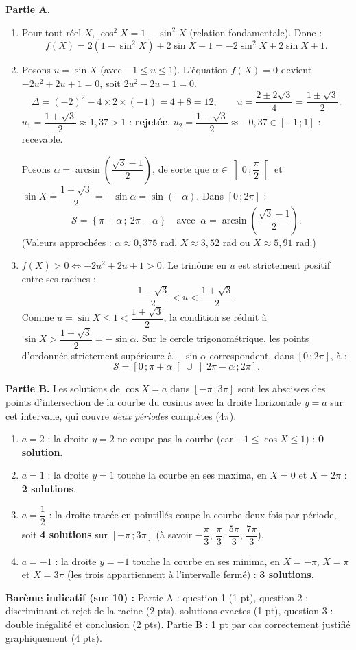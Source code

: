 \documentclass[11pt]{article}
\begin{document}
\begin{corrige}
\textbf{Partie A.}
\begin{enumerate}
\item Pour tout réel $X$, $\cos^2 X=1-\sin^2 X$ (relation fondamentale). Donc :
\[f(X)=2\left(1-\sin^2 X\right)+2\sin X-1=-2\sin^2 X+2\sin X+1.\]
\item Posons $u=\sin X$ (avec $-1\leq u\leq 1$). L'équation $f(X)=0$ devient $-2u^2+2u+1=0$, soit $2u^2-2u-1=0$.
\[\Delta=(-2)^2-4\times 2\times(-1)=4+8=12,\qquad u=\dfrac{2\pm 2\sqrt{3}}{4}=\dfrac{1\pm\sqrt{3}}{2}.\]
$u_1=\dfrac{1+\sqrt{3}}{2}\approx 1{,}37>1$ : \textbf{rejetée}. $u_2=\dfrac{1-\sqrt{3}}{2}\approx -0{,}37\in[-1\,;1]$ : recevable.

Posons $\alpha=\arcsin\left(\dfrac{\sqrt{3}-1}{2}\right)$, de sorte que $\alpha\in\left]0\,;\dfrac{\pi}{2}\right[$ et $\sin X=\dfrac{1-\sqrt{3}}{2}=-\sin\alpha=\sin(-\alpha)$. Dans $[0\,;2\pi]$ :
\[\mathcal{S}=\left\{\pi+\alpha\,;\ 2\pi-\alpha\right\}\quad\text{avec }\ \alpha=\arcsin\left(\dfrac{\sqrt{3}-1}{2}\right).\]
(Valeurs approchées : $\alpha\approx 0{,}375$ rad, $X\approx 3{,}52$ rad ou $X\approx 5{,}91$ rad.)
\item $f(X)>0\Longleftrightarrow -2u^2+2u+1>0$. Le trinôme en $u$ est strictement positif entre ses racines :
\[\dfrac{1-\sqrt{3}}{2}<u<\dfrac{1+\sqrt{3}}{2}.\]
Comme $u=\sin X\leq 1<\dfrac{1+\sqrt{3}}{2}$, la condition se réduit à $\sin X>\dfrac{1-\sqrt{3}}{2}=-\sin\alpha$. Sur le cercle trigonométrique, les points d'ordonnée strictement supérieure à $-\sin\alpha$ correspondent, dans $[0\,;2\pi]$, à :
\[\mathcal{S}=\left[0\,;\pi+\alpha\right[\cup\left]2\pi-\alpha\,;2\pi\right].\]
\end{enumerate}
\textbf{Partie B.} Les solutions de $\cos X=a$ dans $[-\pi\,;3\pi]$ sont les abscisses des points d'intersection de la courbe du cosinus avec la droite horizontale $y=a$ sur cet intervalle, qui couvre \emph{deux périodes} complètes ($4\pi$).
\begin{enumerate}
\item $a=2$ : la droite $y=2$ ne coupe pas la courbe (car $-1\leq\cos X\leq 1$) : \textbf{0 solution}.
\item $a=1$ : la droite $y=1$ touche la courbe en ses maxima, en $X=0$ et $X=2\pi$ : \textbf{2 solutions}.
\item $a=\dfrac{1}{2}$ : la droite tracée en pointillés coupe la courbe deux fois par période, soit \textbf{4 solutions} sur $[-\pi\,;3\pi]$ (à savoir $-\dfrac{\pi}{3}$, $\dfrac{\pi}{3}$, $\dfrac{5\pi}{3}$, $\dfrac{7\pi}{3}$).
\item $a=-1$ : la droite $y=-1$ touche la courbe en ses minima, en $X=-\pi$, $X=\pi$ et $X=3\pi$ (les trois appartiennent à l'intervalle fermé) : \textbf{3 solutions}.
\end{enumerate}
\textbf{Barème indicatif (sur 10) :} Partie A : question 1 (1 pt), question 2 : discriminant et rejet de la racine (2 pts), solutions exactes (1 pt), question 3 : double inégalité et conclusion (2 pts). Partie B : 1 pt par cas correctement justifié graphiquement (4 pts).


\end{corrige}
\end{document}
